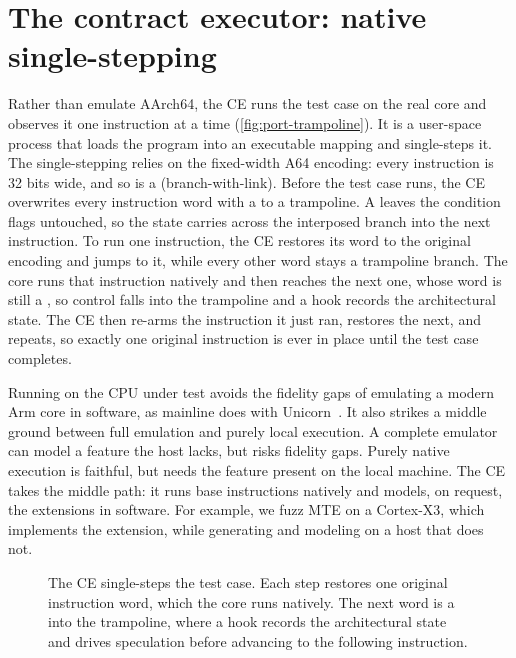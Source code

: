 \section{The contract executor: native single-stepping}
\label{sec:port-ce}

Rather than emulate AArch64, the CE runs the test case on the real core and observes it one
instruction at a time (\autoref{fig:port-trampoline}). It is a user-space process that loads the
program into an executable
mapping and single-steps it. The single-stepping relies on the fixed-width A64 encoding: every
instruction is 32 bits wide, and so is a  (branch-with-link). Before the test case runs,
the CE overwrites every instruction word with a  to a trampoline. A  leaves the
condition flags untouched, so the  state carries across the interposed branch into the
next instruction. To run one instruction, the CE restores its word to the original encoding and
jumps to it, while every other word stays a trampoline branch. The core runs that instruction
natively and then reaches the next one, whose word is still a , so control falls into the
trampoline and a hook records the architectural state. The CE then re-arms the instruction it just
ran, restores the next, and repeats, so exactly one original instruction is ever in place until the
test case completes.

Running on the CPU under test avoids the fidelity gaps of emulating a modern Arm core in software,
as mainline \revizor{} does with Unicorn~\cite{unicorn}. It also strikes a middle ground between full
emulation and purely local execution. A complete emulator can model a feature the host lacks,
but risks fidelity gaps. Purely native execution is faithful, but needs the feature present on
the local machine. The CE takes the middle path: it runs base instructions natively and
models, on request, the extensions in software. For example, we fuzz MTE on a Cortex-X3, which
implements the extension, while generating and modeling on a host that does not.

\begin{figure}[t]
\centering
\fitwidth{}
\caption{The CE single-steps the test case. Each step restores one original instruction word,
which the core runs natively. The next word is a  into the trampoline, where a hook records
the architectural state and drives speculation before advancing to the following instruction.}
\label{fig:port-trampoline}
\end{figure}

